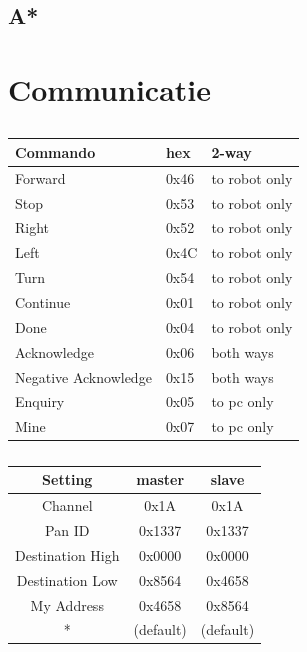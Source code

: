 \documentclass{report}
\begin{document}
\subsection{A*}
\label{ssec:pseudocode-astar}
\cite{pseudocode-astar}

\newpage
\section{Communicatie}
\label{sec:communicatie}
\begin{table}[H]
\centering
\caption{}
\begin{subtable}{0.48\textwidth}
\label{tab:comProtocol}
\centering
\begin{tabular}{@{}lll@{}}
\toprule
\textbf{Commando} & \textbf{hex} & \textbf{2-way} \\
\midrule
Forward				& 0x46 	& to robot only\\
Stop 					& 0x53 	& to robot only\\
Right 					& 0x52 	& to robot only\\
Left 					& 0x4C 	& to robot only\\
Turn					& 0x54 	& to robot only\\
Continue				& 0x01	& to robot only\\
Done 					& 0x04	& to robot only\\
Acknowledge 			& 0x06	& both ways\\
Negative Acknowledge 		& 0x15	& both ways \\
Enquiry 				& 0x05	& to pc only\\
Mine 					& 0x07	& to pc only\\
\bottomrule
\end{tabular}
\end{subtable}
\quad
\begin{subtable}{0.48\textwidth}
\label{tab:XBeeSettings}
\centering
\begin{tabular}{@{}ccc@{}}
\toprule
\textbf{Setting} & \textbf{master}& \textbf{slave} \\
\midrule
Channel				& 0x1A 	& 0x1A\\
Pan ID				& 0x1337 	& 0x1337\\
Destination High			& 0x0000	& 0x0000\\
Destination Low			& 0x8564 	& 0x4658\\
My Address				& 0x4658 	& 0x8564\\
*		 			& (default)	&(default)\\
\bottomrule
\end{tabular}
\end{subtable}
\end{table}
\end{document}
